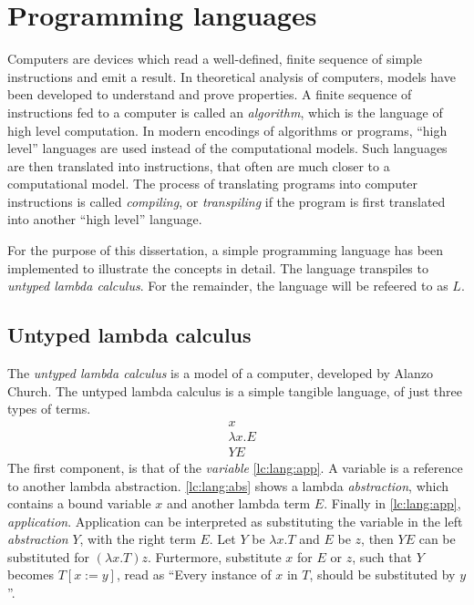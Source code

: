 \documentclass[11pt,oneside,a4paper]{report}
\begin{document}
\chapter{Programming languages}
Computers are devices which read a well-defined, finite sequence of simple instructions and emit a result.
In theoretical analysis of computers, models have been developed to understand and prove properties.
A finite sequence of instructions fed to a computer is called an \textit{algorithm}, which is the language of high level computation\cite{copeland1997church}.
In modern encodings of algorithms or programs, ``high level'' languages are used instead of the computational models.
Such languages are then translated into instructions, that often are much closer to a computational model.
The process of translating programs into computer instructions is called \textit{compiling}, or \textit{transpiling} if the program is first translated into another ``high level'' language.

For the purpose of this dissertation, a simple programming language has been implemented to illustrate the concepts in detail.
The language transpiles to \textit{untyped lambda calculus}.
For the remainder, the language will be refeered to as $L$.

\section{Untyped lambda calculus}
The \textit{untyped lambda calculus} is a model of a computer, developed by Alanzo Church\cite{church1936unsolvable}.
The untyped lambda calculus is a simple tangible language, of just three types of terms.
\begin{align}
  &x
  \label{lc:lang:var}\\
  &\lambda x . E
  \label{lc:lang:abs}\\
  &Y E
  \label{lc:lang:app}
\end{align}
The first component, is that of the \textit{variable} \autoref{lc:lang:app}.
A variable is a reference to another lambda abstraction.
\autoref{lc:lang:abs} shows a lambda \textit{abstraction}, which contains a bound variable $x$ and another lambda term $E$.
Finally in \autoref{lc:lang:app}, \textit{application}.
Application can be interpreted as substituting the variable in the left \textit{abstraction} $Y$, with the right term $E$.
Let $Y$ be $\lambda x . T$ and $E$ be $z$, then $Y E$ can be substituted for $(\lambda x . T) z$.
Furtermore, substitute $x$ for $E$ or $z$, such that $Y$ becomes $T[x := y]$, read as ``Every instance of $x$ in $T$, should be substituted by $y$''.
\end{document}
